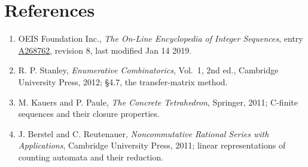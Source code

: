 \documentclass[11pt]{article}
\theoremstyle{definition}
\begin{document}
\section{References}

\begin{enumerate}

\item OEIS Foundation Inc., \emph{The On-Line Encyclopedia of Integer Sequences}, entry \href{https://oeis.org/A268762}{A268762}, revision 8, last modified Jan 14 2019.

\item R. P. Stanley, \emph{Enumerative Combinatorics}, Vol.~1, 2nd ed., Cambridge University Press, 2012; \S4.7, the transfer-matrix method.

\item M. Kauers and P. Paule, \emph{The Concrete Tetrahedron}, Springer, 2011; C-finite sequences and their closure properties.

\item J. Berstel and C. Reutenauer, \emph{Noncommutative Rational Series with Applications}, Cambridge University Press, 2011; linear representations of counting automata and their reduction.

\end{enumerate}
\end{document}

